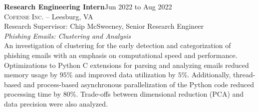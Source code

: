 \documentclass[hidelinks, 10pt]{article}
\def\contentspacing{2.5mm}          %
\begin{document}
{\vspace{\contentspacing}

\begin{minipage}[ct]{0.9\linewidth}
    \textbf{Research Engineering Intern}\hfill Jun 2022 to Aug 2022\\
    \textsc{Cofense Inc.} -- Leesburg, VA\\
    Research Supervisor: Chip McSweeney, Senior Research Engineer\vspace{1mm}\\
    {\textit{Phishing Emails: Clustering and Analysis}}\\
    An investigation of clustering for the early detection and categorization of
    phishing emails with an emphasis on computational speed and performance.  Optimizations to Python C extensions for parsing and analyzing
    emails reduced memory usage by $95$\% and improved data utilization by $5$\%. Additionally, thread-based and process-based asynchronous
    parallelization of the Python code reduced processing time by $80$\%. Trade-offs between dimensional reduction (PCA) and data precision
    were also analyzed.
\end{minipage}

\vspace{\contentspacing}

}
\end{document}
